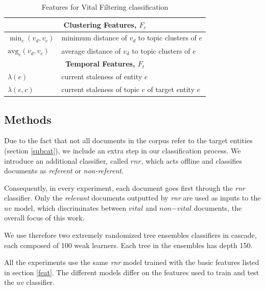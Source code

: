 \documentclass{article}
\begin{document}
\begin{table}[tb]
{\begin{tabular}{p{}p{}}
\midrule
\multicolumn{2}{c}{\textbf{Clustering Features, $F_c$}} \\ %
\midrule
  $\min_c(v_d,v_c)$& minimum distance of $v_d$ to topic clusters of $e$ \\
  $\text{avg}_c(v_d,v_c)$& average distance of $v_d$ to topic clusters of $e$ \\
\midrule
\multicolumn{2}{c}{\textbf{Temporal Features, $F_t$}} \\ %
\midrule
  $\lambda(e)$& current staleness of entity $e$ \\
  $\lambda(e,c)$& current staleness of topic $c$ of target entity $e$ \\
\bottomrule
\end{tabular}
} %
\caption{Features for Vital Filtering classification}
\label{features}
\end{table}


\subsection{Methods}
\label{expe}

Due to the fact that not all documents in the corpus refer to the target entities (section \ref{subcat}), we include an extra step in our classification process. We introduce an additional classifier, called $rnr$, which acts offline and classifies documents as \emph{referent} or \emph{non-referent}.

Consequently, in every experiment, each document goes first through the \emph{rnr} classifier. Only the \emph{relevant} documents outputted by \emph{rnr} are used as inputs to the $uv$ model, which discriminates between $vital$ and $non\mathord{-}vital$ documents, the overall focus of this work.

We use therefore two extremely randomized tree ensembles classifiers \cite{GEW06a} in cascade, each composed of 100 weak learners. Each tree in the ensembles has depth 150.

All the experiments use the same \emph{rnr} model trained with the basic features listed in section \ref{feat}. 
The different models differ on the features used to train and test the $uv$ classifier.
\end{document}
